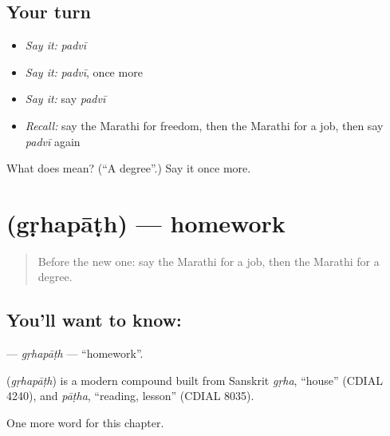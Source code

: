 \subsection*{Your turn}
\begin{itemize}
\raggedright
  \item \emph{Say it:} \emph{padvī}
  \item \emph{Say it:} \emph{padvī}, once more
  \item \emph{Say it:} say \emph{padvī}
  \item \emph{Recall:} say the Marathi for freedom, then the Marathi for a job, then say \emph{padvī} again
\end{itemize}

\begin{tcolorbox}[breakable,colback=teal!4,colframe=teal!35!black,title={Before you move on}]
What does  mean? (\textquotedblleft{}A degree\textquotedblright{}.) Say it once more.
\end{tcolorbox}
\section[\texorpdfstring{\mr{गृहपाठ} (gṛhapāṭh)}{गृहपाठ (gṛhapāṭh)}]{ (gṛhapāṭh) — homework}

\label{lesson:MR-C247-grhapath}



\begin{quote}
Before the new one: say the Marathi for a job, then the Marathi for a degree.
\end{quote}

\subsection*{You'll want to know: }
\textbf{} — \emph{gṛhapāṭh} — \textquotedblleft{}homework\textquotedblright{}.

\begin{cousinweb}
\textbf{} (\emph{gṛhapāṭh}) is a modern compound built from Sanskrit \emph{gṛha}, \textquotedblleft{}house\textquotedblright{} (CDIAL 4240), and \emph{pāṭha}, \textquotedblleft{}reading, lesson\textquotedblright{} (CDIAL 8035).
\end{cousinweb}

\begin{grammarlens}[title={What you've built}]
One more word for this chapter.
\end{grammarlens}

